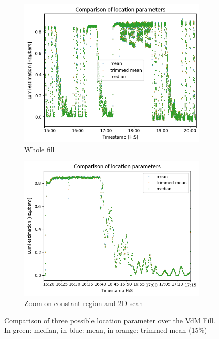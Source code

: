 \begin{figure}
    \centering
    \begin{subfigure}{0.48\textwidth}
    \includegraphics[width=\linewidth]{figures/comparison_location_whole.png}
    \caption{Whole fill}\label{fig:comparison_whole}
    \end{subfigure}
    \begin{subfigure}{0.48\textwidth}
    \includegraphics[width=\linewidth]{figures/comparison_location.png}
    \caption{Zoom on constant region and 2D scan}\label{fig:comparison_zoom}
    \end{subfigure}
    \caption{Comparison of three possible location parameter over the VdM Fill. In green: median, in blue: mean, in orange: trimmed mean (15\%)}
    \label{fig:lumi_estimator_location_param}
\end{figure}

